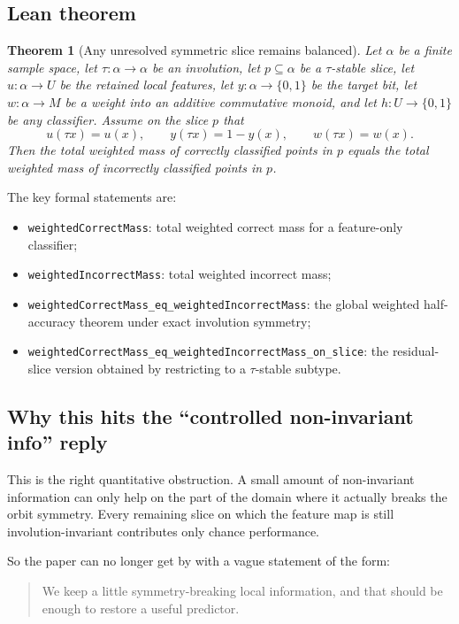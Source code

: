 \documentclass[11pt]{article}
\newtheorem{theorem}{Theorem}[section]
\theoremstyle{remark}
\begin{document}
\subsection{Lean theorem}

\begin{theorem}[Any unresolved symmetric slice remains balanced]
Let \(\alpha\) be a finite sample space, let \(\tau : \alpha \to \alpha\) be an involution, let
\(p \subseteq \alpha\) be a \(\tau\)-stable slice, let \(u : \alpha \to U\) be the retained local
features, let \(y : \alpha \to \{0,1\}\) be the target bit, let \(w : \alpha \to M\) be a weight
into an additive commutative monoid, and let \(h : U \to \{0,1\}\) be any classifier.  Assume on
the slice \(p\) that
\[
  u(\tau x) = u(x), \qquad y(\tau x) = 1-y(x), \qquad w(\tau x) = w(x).
\]
Then the total weighted mass of correctly classified points in \(p\) equals the total weighted
mass of incorrectly classified points in \(p\).
\end{theorem}

\noindent
The key formal statements are:
\begin{itemize}[leftmargin=1.5em]
  \item \texttt{weightedCorrectMass}: total weighted correct mass for a feature-only classifier;
  \item \texttt{weightedIncorrectMass}: total weighted incorrect mass;
  \item \texttt{weightedCorrectMass\_eq\_weightedIncorrectMass}: the global weighted half-accuracy
  theorem under exact involution symmetry;
  \item \texttt{weightedCorrectMass\_eq\_weightedIncorrectMass\_on\_slice}: the residual-slice
  version obtained by restricting to a \(\tau\)-stable subtype.
\end{itemize}

\subsection{Why this hits the ``controlled non-invariant info'' reply}

This is the right quantitative obstruction.  A small amount of non-invariant information can only
help on the part of the domain where it actually breaks the orbit symmetry.  Every remaining
slice on which the feature map is still involution-invariant contributes only chance performance.

So the paper can no longer get by with a vague statement of the form:
\begin{quote}
We keep a little symmetry-breaking local information, and that should be enough to restore a
useful predictor.
\end{quote}
\end{document}
